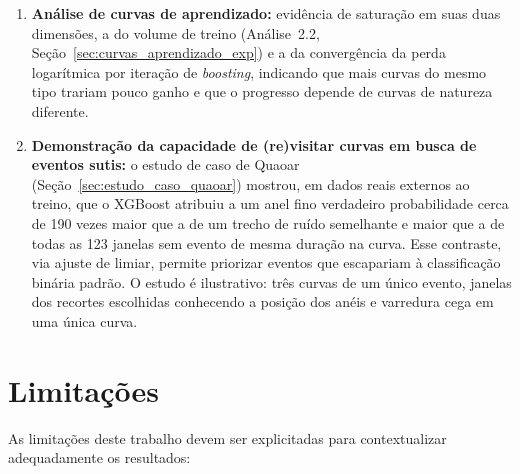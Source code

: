 \begin{enumerate}
	\item \textbf{Análise de curvas de aprendizado:} evidência de saturação em suas duas dimensões, a do volume de treino (Análise~2.2, Seção~\ref{sec:curvas_aprendizado_exp}) e a da convergência da perda logarítmica por iteração de \textit{boosting}, indicando que mais curvas do mesmo tipo trariam pouco ganho e que o progresso depende de curvas de natureza diferente.

	\item \textbf{Demonstração da capacidade de (re)visitar curvas em busca de eventos sutis:} o estudo de caso de Quaoar (Seção~\ref{sec:estudo_caso_quaoar}) mostrou, em dados reais externos ao treino, que o XGBoost atribuiu a um anel fino verdadeiro probabilidade cerca de 190 vezes maior que a de um trecho de ruído semelhante e maior que a de todas as 123 janelas sem evento de mesma duração na curva. Esse contraste, via ajuste de limiar, permite priorizar eventos que escapariam à classificação binária padrão. O estudo é ilustrativo: três curvas de um único evento, janelas dos recortes escolhidas conhecendo a posição dos anéis e varredura cega em uma única curva.
\end{enumerate}

\section{Limitações}

As limitações deste trabalho devem ser explicitadas para contextualizar adequadamente os resultados:


